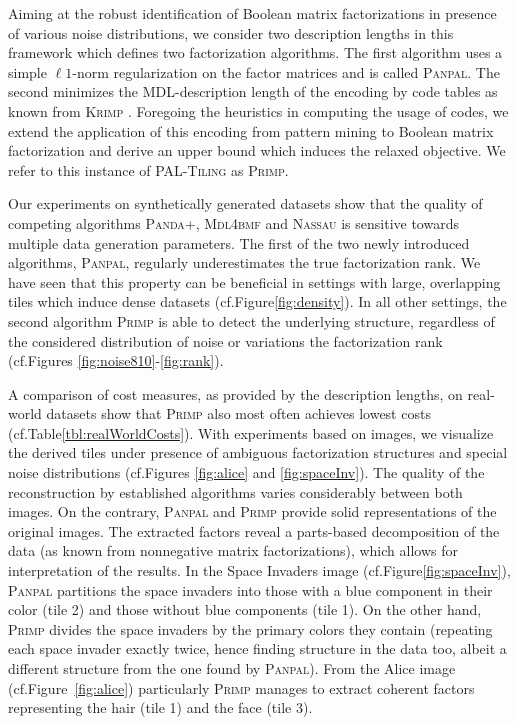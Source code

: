 Aiming at the robust identification of Boolean matrix factorizations in presence of various noise distributions, we consider two description lengths in this framework which defines two factorization algorithms. The first algorithm uses a simple $\ell 1$-norm regularization on the factor matrices and is called \textsc{Panpal}. The second minimizes the MDL-description length of the encoding by code tables as known from \textsc{Krimp} \citep{siebes2006item}. Foregoing the heuristics in computing the usage of codes, we extend the application of this encoding from pattern mining to Boolean matrix factorization and derive an upper bound which induces the relaxed objective. We refer to this instance of \textsc{PAL-Tiling} as \textsc{Primp}.

Our experiments on synthetically generated datasets show  that the quality of competing algorithms \textsc{Panda+}, \textsc{Mdl4bmf} and \textsc{Nassau} is sensitive towards multiple data generation parameters. The first of the two newly introduced algorithms, \textsc{Panpal}, regularly underestimates the true factorization rank. We have seen that this property can be beneficial in settings with large, overlapping tiles which induce dense datasets (cf.\@ Figure\@ \ref{fig:density}). In all other settings, the second algorithm \textsc{Primp} is able to detect the underlying structure, regardless of the considered distribution of noise or variations the factorization rank (cf.\@ Figures \ref{fig:noise810}-\ref{fig:rank}). 

A comparison of cost measures, as provided by the description lengths, on real-world datasets show that \textsc{Primp} also most often achieves lowest costs (cf.\@ Table\@ \ref{tbl:realWorldCosts}). With experiments based on images, we visualize the derived tiles under  presence of ambiguous factorization structures and special noise distributions (cf.\@ Figures \ref{fig:alice} and \ref{fig:spaceInv}). The quality of the reconstruction by established algorithms varies considerably between both images. On the contrary, \textsc{Panpal} and \textsc{Primp} provide solid representations of the original images. The extracted factors reveal a parts-based decomposition of the data (as known from nonnegative matrix factorizations), which allows for interpretation of the results. In the Space Invaders image (cf.\@ Figure\@ \ref{fig:spaceInv}), \textsc{Panpal} partitions the space invaders into those with a blue component in their color (tile 2) and those without blue components (tile 1). On the other hand, \textsc{Primp} divides the space invaders by the primary colors they contain (repeating each space invader exactly twice, hence finding structure in the data too, albeit a different structure from the one found by \textsc{Panpal}). From the Alice image (cf.\@ Figure~\ref{fig:alice}) particularly \textsc{Primp} manages to extract coherent factors representing the hair (tile 1) and the face (tile 3).

